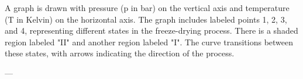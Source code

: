 A graph is drawn with pressure (p in bar) on the vertical axis and temperature (T in Kelvin) on the horizontal axis. The graph includes labeled points 1, 2, 3, and 4, representing different states in the freeze-drying process. There is a shaded region labeled "II" and another region labeled "I". The curve transitions between these states, with arrows indicating the direction of the process.

---